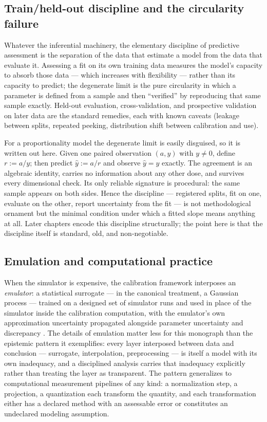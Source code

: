\subsection{Train/held-out discipline and the circularity failure}\label{ch02:calibration:split}

Whatever the inferential machinery, the elementary discipline of predictive assessment is the separation of the data that estimate a model from the data that evaluate it. Assessing a fit on its own training data measures the model's capacity to absorb those data --- which increases with flexibility --- rather than its capacity to predict; the degenerate limit is the pure circularity in which a parameter is defined from a sample and then ``verified'' by reproducing that same sample exactly. Held-out evaluation, cross-validation, and prospective validation on later data are the standard remedies, each with known caveats (leakage between splits, repeated peeking, distribution shift between calibration and use).

For a proportionality model the degenerate limit is easily disguised, so it is written out here. Given one paired observation $(a, y)$ with $y \neq 0$, define $r := a/y$; then predict $\hat{y} := a/r$ and observe $\hat{y} = y$ exactly. The agreement is an algebraic identity, carries no information about any other dose, and survives every dimensional check. Its only reliable signature is procedural: the same sample appears on both sides. Hence the discipline --- registered splits, fit on one, evaluate on the other, report uncertainty from the fit --- is not methodological ornament but the minimal condition under which a fitted slope means anything at all. Later chapters encode this discipline structurally; the point here is that the discipline itself is standard, old, and non-negotiable.

\subsection{Emulation and computational practice}\label{ch02:calibration:emulation}

When the simulator is expensive, the calibration framework interposes an \emph{emulator}: a statistical surrogate --- in the canonical treatment, a Gaussian process --- trained on a designed set of simulator runs and used in place of the simulator inside the calibration computation, with the emulator's own approximation uncertainty propagated alongside parameter uncertainty and discrepancy \cite{kennedyohagan}. The details of emulation matter less for this monograph than the epistemic pattern it exemplifies: every layer interposed between data and conclusion --- surrogate, interpolation, preprocessing --- is itself a model with its own inadequacy, and a disciplined analysis carries that inadequacy explicitly rather than treating the layer as transparent. The pattern generalizes to computational measurement pipelines of any kind: a normalization step, a projection, a quantization each transform the quantity, and each transformation either has a declared method with an assessable error or constitutes an undeclared modeling assumption.

